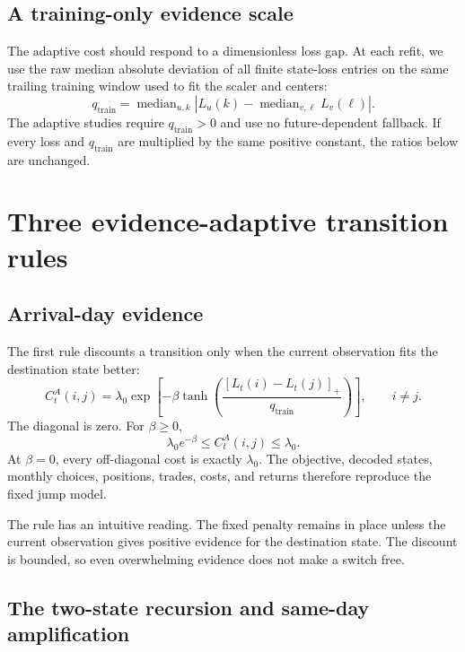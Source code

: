 \documentclass[11pt]{article}
\begin{document}
\subsection{A training-only evidence scale}

The adaptive cost should respond to a dimensionless loss gap. At each refit, we use the raw median absolute deviation of all finite state-loss entries on the same trailing training window used to fit the scaler and centers:
\begin{equation}
q_{\mathrm{train}}=
\operatorname{median}_{u,k}
\left|L_u(k)-\operatorname{median}_{v,\ell}L_v(\ell)\right|.
\label{eq:qtrain}
\end{equation}
The adaptive studies require $q_{\mathrm{train}}>0$ and use no future-dependent fallback. If every loss and $q_{\mathrm{train}}$ are multiplied by the same positive constant, the ratios below are unchanged.

\section{Three evidence-adaptive transition rules}

\subsection{Arrival-day evidence}

The first rule discounts a transition only when the current observation fits the destination state better:
\begin{equation}
C_t^{A}(i,j)=\lambda_0\exp\left[
-\beta\tanh\left(
\frac{[L_t(i)-L_t(j)]_+}{q_{\mathrm{train}}}
\right)\right],
\qquad i\neq j.
\label{eq:arrival}
\end{equation}
The diagonal is zero. For $\beta\geq 0$,
\begin{equation}
\lambda_0 e^{-\beta}\leq C_t^A(i,j)\leq\lambda_0.
\end{equation}
At $\beta=0$, every off-diagonal cost is exactly $\lambda_0$. The objective, decoded states, monthly choices, positions, trades, costs, and returns therefore reproduce the fixed jump model.

The rule has an intuitive reading. The fixed penalty remains in place unless the current observation gives positive evidence for the destination state. The discount is bounded, so even overwhelming evidence does not make a switch free.

\subsection{The two-state recursion and same-day amplification}
\end{document}
